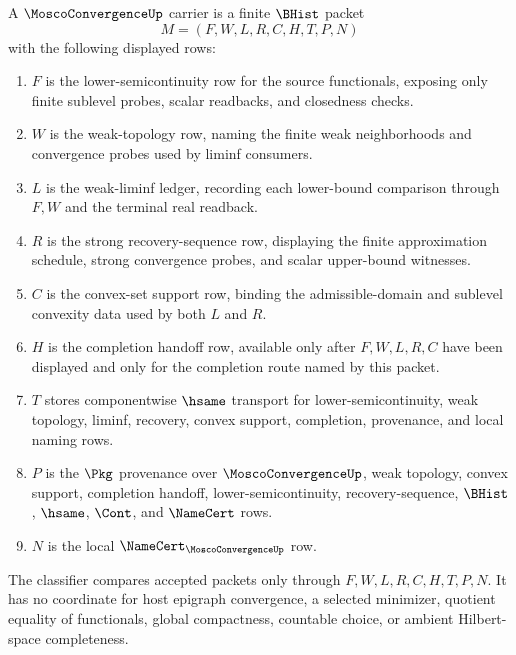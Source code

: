 \begin{definition}
\label{def:mosco-convergence-carrier}
A $\MoscoConvergenceUp$ carrier is a finite $\BHist$ packet
$$
M=(F,W,L,R,C,H,T,P,N)
$$
with the following displayed rows:
\begin{enumerate}
\item $F$ is the lower-semicontinuity row for the source functionals, exposing only finite sublevel probes, scalar readbacks, and closedness checks.
\item $W$ is the weak-topology row, naming the finite weak neighborhoods and convergence probes used by liminf consumers.
\item $L$ is the weak-liminf ledger, recording each lower-bound comparison through $F,W$ and the terminal real readback.
\item $R$ is the strong recovery-sequence row, displaying the finite approximation schedule, strong convergence probes, and scalar upper-bound witnesses.
\item $C$ is the convex-set support row, binding the admissible-domain and sublevel convexity data used by both $L$ and $R$.
\item $H$ is the completion handoff row, available only after $F,W,L,R,C$ have been displayed and only for the completion route named by this packet.
\item $T$ stores componentwise $\hsame$ transport for lower-semicontinuity, weak topology, liminf, recovery, convex support, completion, provenance, and local naming rows.
\item $P$ is the $\Pkg$ provenance over $\MoscoConvergenceUp$, weak topology, convex support, completion handoff, lower-semicontinuity, recovery-sequence, $\BHist$, $\hsame$, $\Cont$, and $\NameCert$ rows.
\item $N$ is the local $\NameCert_{\MoscoConvergenceUp}$ row.
\end{enumerate}
The classifier compares accepted packets only through $F,W,L,R,C,H,T,P,N$. It has no coordinate for host epigraph convergence, a selected minimizer, quotient equality of functionals, global compactness, countable choice, or ambient Hilbert-space completeness.
\end{definition}

